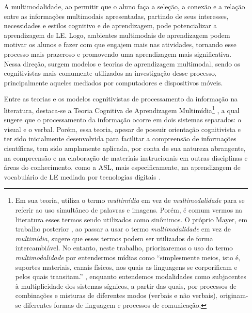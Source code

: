 A multimodalidade, ao permitir que o aluno faça a seleção, a conexão e a
relação entre as informações multimodais apresentadas, partindo de seus
interesses, necessidades e estilos cognitivo e de aprendizagem, pode
potencializar a aprendizagem de LE. Logo, ambientes multimodais de
aprendizagem podem motivar os alunos e fazer com que engajem mais nas
atividades, tornando esse processo mais prazeroso e promovendo uma
aprendizagem mais significativa. Nessa direção, surgem modelos e teorias
de aprendizagem multimodal, sendo os cognitivistas mais comumente
utilizados na investigação desse processo, principalmente aqueles
mediados por computadores e dispositivos móveis.

Entre as teorias e os modelos cognitivistas de processamento da
informação na literatura, destaca-se a Teoria Cognitiva de Aprendizagem
Multimídia\footnote{Em sua teoria, \textcite{mayer2001} utiliza o termo
\emph{multimídia} em vez de \emph{multimodalidade} para se referir ao
uso simultâneo de palavras e imagens. Porém, é comum vermos na
literatura esses termos sendo utilizados como sinônimos. O próprio
Mayer, em trabalho posterior \cite{moreno2007}, ao passar a usar
o termo \emph{multimodalidade} em vez de \emph{multimídia}, sugere que
esses termos podem ser utilizados de forma intercambiável. No entanto,
neste trabalho, priorizaremos o uso do termo \emph{multimodalidade}
por entendermos mídias como ``simplesmente meios, isto é, suportes
materiais, canais físicos, nos quais as linguagens se corporificam e
pelos quais transitam.'' \cite[p.~77]{santaella2007linguagens}, enquanto entendemos
modalidades como subjacentes à multiplicidade dos sistemas sígnicos, a
partir das quais, por processos de combinações e misturas de
diferentes modos (verbais e não verbais), originam-se diferentes
formas de linguagem e processos de comunicação.} \cite{mayer2001}, a qual
sugere que o processamento da informação ocorre em dois sistemas
separados: o visual e o verbal. Porém, essa teoria, apesar de possuir
orientação cognitivista e ter sido inicialmente desenvolvida para
facilitar a compreensão de informações científicas, tem sido amplamente
aplicada, por conta de sua natureza abrangente, na compreensão e na
elaboração de materiais instrucionais em outras disciplinas e áreas do
conhecimento, como a ASL, mais especificamente, na aprendizagem de
vocabulário de LE mediada por tecnologias digitais \cite{souza2004,procopio2016,monteiro2021}.


